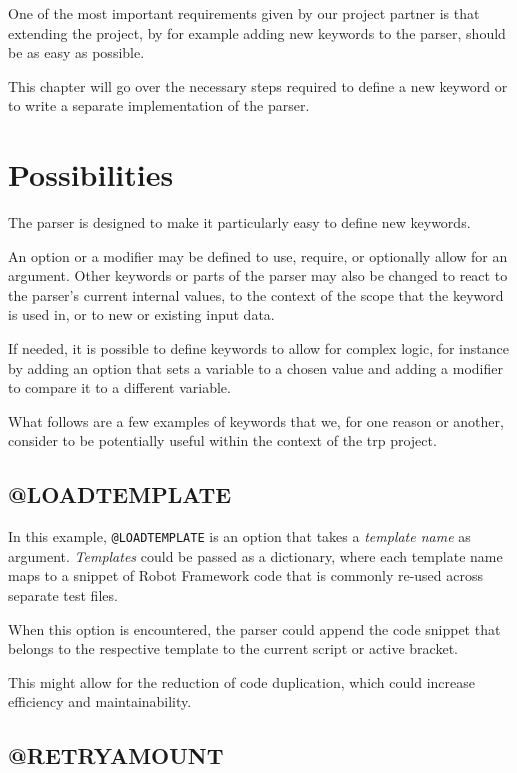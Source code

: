
One of the most important requirements given by our project partner is that extending the project, by for example adding new keywords to the parser, should be as easy as possible. 

This chapter will go over the necessary steps required to define a new keyword or to write a separate implementation of the parser. 

\section{Possibilities}

The parser is designed to make it particularly easy to define new keywords.

An option or a modifier may be defined to use, require, or optionally allow for an argument. Other keywords or parts of the parser may also be changed to react to the parser's current internal values, to the context of the scope that the keyword is used in, or to new or existing input data. 

If needed, it is possible to define keywords to allow for complex logic, for instance by adding an option that sets a variable to a chosen value and adding a modifier to compare it to a different variable.

What follows are a few examples of keywords that we, for one reason or another, consider to be potentially useful within the context of the \gls{trp} project. 

\subsection{@LOADTEMPLATE}

In this example, \verb|@LOADTEMPLATE| is an option that takes a \textit{template name} as argument. \textit{Templates} could be passed as a dictionary, where each template name maps to a snippet of Robot Framework code that is commonly re-used across separate test files. 

When this option is encountered, the parser could append the code snippet that belongs to the respective template to the current script or active bracket. 

This might allow for the reduction of code duplication, which could increase efficiency and maintainability. 

\subsection{@RETRYAMOUNT}

